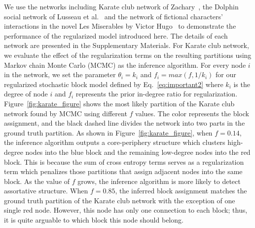 We use the networks including Karate club network of Zachary~\cite{zachary1977information}, the Dolphin social network of Lusseau et al.~\cite{lusseau2003bottlenose} and the network of fictional characters' interactions in the novel Les Miserables by Victor Hugo~\cite{newman2004finding} to demonstrate the performance of the regularized model introduced here. The details of each network are presented in the Supplementary Materials. For Karate club network, we evaluate the effect of the regularization terms on the resulting partitions using Markov chain Monte Carlo (MCMC) as the inference algorithm. For every node $i$ in the network, we set the parameter $\theta_i = k_i$ and $f_i = max(f, 1/k_i)$ for our regularized stochastic block model defined by Eq.~\ref{eq:important2} where $k_i$ is the degree of node $i$ and $f_i$ represents the prior in-degree ratio for regularization. Figure~\ref{fig:karate_figure} shows the most likely partition of the Karate club network found by MCMC using different $f$ values. The color represents the block assignment, and the black dashed line divides the network into two parts in the ground truth partition. As shown in Figure~\ref{fig:karate_figure}, when $f=0.14$, the inference algorithm outputs a core-periphery structure which clusters high-degree nodes into the blue block and the remaining low-degree nodes into the red block. This is because the sum of cross entropy terms serves as a regularization term which penalizes those partitions that assign adjacent nodes into the same block. As the value of $f$ grows, the inference algorithm is more likely to detect assortative structure. When $f=0.85$, the inferred block assignment matches the ground truth partition of the Karate club network with the exception of one single red node. However, this node has only one connection to each block; thus, it is quite arguable to which block this node should belong.

